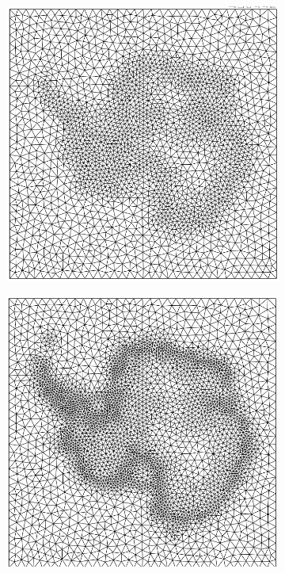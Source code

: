 \documentclass{article}
\begin{document}
\begin{figure}[H]
\begin{subfigure}[b]{0.3\linewidth}
    \includegraphics[width=\linewidth]{Fig_mesh_step_02.png}
    \caption{}
  \end{subfigure}
  \begin{subfigure}[b]{0.3\linewidth}
    \includegraphics[width=\linewidth]{Fig_mesh_step_03.png}

\end{subfigure}
\end{figure}
\end{document}
